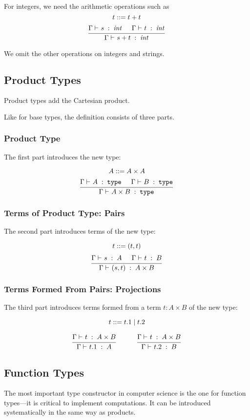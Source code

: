 For integers, we need the arithmetic operations such as
\[t ::= t+t\]
\[\cfrac{\Gamma\vdash^{}_{}s\;:\;\mathit{int}\hspace*{.5cm} \Gamma\vdash^{}_{}t\;:\;\mathit{int}}{\Gamma\vdash^{}_{}s+t\;:\;\mathit{int}}\,\]

We omit the other operations on integers and strings.

\subsection{Product Types}

Product types add the Cartesian product.

Like for base types, the definition consists of three parts.

\subsubsection{Product Type}

The first part introduces the new type:

\[A ::= A\times A\]
\[\cfrac{\Gamma\vdash^{}_{}A\;:\;\mathtt{type}\hspace*{.5cm} \Gamma\vdash^{}_{}B\;:\;\mathtt{type}}{\Gamma\vdash^{}_{}A\times B\;:\;\mathtt{type}}\,\]

\subsubsection{Terms of Product Type: Pairs}

The second part introduces terms of the new type:

\[t ::= (t,t)\]
\[\cfrac{\Gamma\vdash^{}_{}s\;:\;A\hspace*{.5cm} \Gamma\vdash^{}_{}t\;:\;B}{\Gamma\vdash^{}_{}(s,t)\;:\;A\times B}\,\]

\subsubsection{Terms Formed From Pairs: Projections}

The third part introduces terms formed from a term $t:A\times B$ of the new type:

\[t ::= t.1 \;|\; t.2\]

\[\rul{\oftype{}{\Gamma}{t}{A\times B}}{\oftype{}{\Gamma}{t.1}{A}}
\tb\tb
 \rul{\oftype{}{\Gamma}{t}{A\times B}}{\oftype{}{\Gamma}{t.2}{B}}\]

\subsection{Function Types}

The most important type constructor in computer science is the one for function types---it is critical to implement computations.
It can be introduced systematically in the same way as products.

